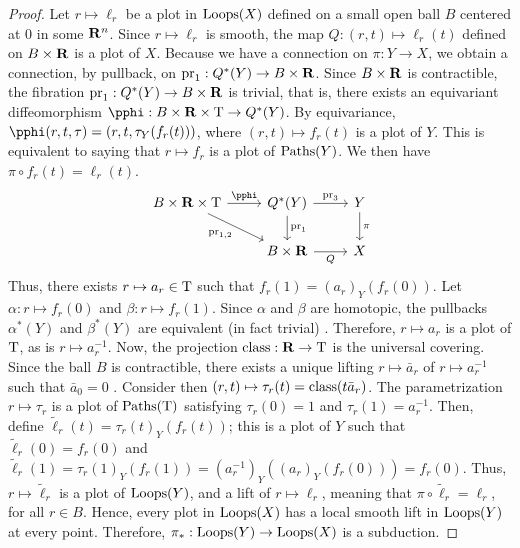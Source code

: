 \begin{proof}
  Let $r\mapsto \ell_r$ be a plot in $\operatorname{Loops}(X)$ defined on a small open ball $B$ centered at $0$ in some $\mathbf{R}^n$.
  Since $r\mapsto \ell_r$ is smooth,
  the map $Q : (r,t) \mapsto \ell_r(t)$ defined on $B \times \mathbf{R}$ is a plot of $X$.
  Because we have a connection on $\pi : Y \to X$,
  we obtain a connection,
  by pullback,
  on $\operatorname{pr}_1  : Q^*(Y) \to B \times \mathbf{R}$.
  Since $B \times \mathbf{R}$ is contractible,
  the fibration $\operatorname{pr}_1  : Q^*(Y) \to B \times \mathbf{R}$ is trivial,
  that is,
  there exists an equivariant diffeomorphism $\pphi : B \times \RR \times \Torus \to Q^*(Y)$.
  By equivariance,
  $\pphi(r,t,\tau)=(r,t,\tau_Y(f_r(t)))$,
  where $(r,t) \mapsto f_r(t)$ is a plot of $Y$.
  This is equivalent to saying that $r \mapsto f_r$ is a plot of $\operatorname{Paths}(Y)$.
  We then have $\pi \circ f_r(t) = \ell_r(t)$.
  \[
  \begin{tikzcd}
    B \times \RR \times \Torus \arrow{r}{\pphi} \arrow[swap]{dr}{\Proj_{1,2}} & Q^*(Y) \arrow{d}{\Proj_1} \arrow{r}{\Proj_3}       & Y  \arrow{d}{\pi} \\
    & B \times \RR \arrow{r}[swap]{Q} & X
  \end{tikzcd}
  \]
  Thus,
  there exists $r \mapsto a_r \in \mathrm{T}$ such that $f_r(1) = (a_r)_Y(f_r(0))$.
  Let $\alpha : r \mapsto f_r(0)$ and $\beta : r \mapsto f_r(1)$.
  Since $\alpha$ and $\beta$ are homotopic,
  the pullbacks $\alpha^*(Y)$ and $\beta^*(Y)$ are equivalent (in fact trivial) \cite[\textsection\,8.34]{PIZ13}.
  Therefore,
  $r\mapsto a_r$ is a plot of $\mathrm{T}$,
  as is $r\mapsto a_r^{-1}$.
  Now,
  the projection $\operatorname{class} : \mathbf{R} \to \mathrm{T}$ is the universal covering.
  Since the ball $B$ is contractible,
  there exists a unique lifting $r \mapsto \bar a_r$ of $r\mapsto a_r^{-1}$ such that $\bar a_0=0$ \cite[\textsection\,8.25]{PIZ13}.
  Consider then $(r,t) \mapsto \tau_r(t) = \operatorname{class}(t\bar a_r)$.
  The parametrization $r \mapsto \tau_r$ is a plot of $\operatorname{Paths}(\mathrm{T})$ satisfying $\tau_r(0) = 1$ and $\tau_r(1) = a_r^{-1}$.
  Then,
  define $\tilde \ell_r(t)=\tau_r(t)_Y(f_r(t))$;
  this is a plot of $Y$ such that $\tilde \ell_r(0)=f_r(0)$ and $\tilde \ell_r(1)=\tau_r(1)_Y(f_r(1)) = (a_r^{-1})_Y((a_r)_Y(f_r(0)))=f_r(0)$.
  Thus,
  $r \mapsto \tilde \ell_r$ is a plot of $\operatorname{Loops}(Y)$,
  and a lift of $r \mapsto \ell_r$,
  meaning that $\pi \circ \tilde \ell_r=\ell_r$,
  for all $r\in B$.
  Hence,
  every plot in $\operatorname{Loops}(X)$ has a local smooth lift in $\operatorname{Loops}(Y)$ at every point.
  Therefore,
  $\pi_* : \operatorname{Loops}(Y) \to \operatorname{Loops}(X)$ is a subduction.
\end{proof}

